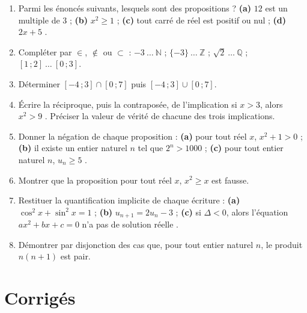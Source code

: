 \begin{enumerate}
  \item Parmi les énoncés suivants, lesquels sont des propositions ?
        \textbf{(a)} \og $12$ est un multiple de $3$ \fg{} ;
        \textbf{(b)} \og $x^2 \geq 1$ \fg{} ;
        \textbf{(c)} \og tout carré de réel est positif ou nul \fg{} ;
        \textbf{(d)} \og $2x+5$ \fg{}.
  \item Compléter par $\in$, $\notin$ ou $\subset$ : $-3 \ \ldots \ \mathbb{N}$ ; \quad
        $\{-3\} \ \ldots \ \mathbb{Z}$ ; \quad $\sqrt{2} \ \ldots \ \mathbb{Q}$ ; \quad
        $[1\,;2] \ \ldots \ [0\,;3]$.
  \item Déterminer $[-4\,;3] \cap [0\,;7]$ puis $[-4\,;3] \cup [0\,;7]$.
  \item Écrire la réciproque, puis la contraposée, de l'implication \og si $x>3$, alors
        $x^2>9$ \fg{}. Préciser la valeur de vérité de chacune des trois implications.
  \item Donner la négation de chaque proposition :
        \textbf{(a)} \og pour tout réel $x$, $x^2+1>0$ \fg{} ;
        \textbf{(b)} \og il existe un entier naturel $n$ tel que $2^n>1000$ \fg{} ;
        \textbf{(c)} \og pour tout entier naturel $n$, $u_n \geq 5$ \fg{}.
  \item Montrer que la proposition \og pour tout réel $x$, $x^2 \geq x$ \fg{} est fausse.
  \item Restituer la quantification implicite de chaque écriture :
        \textbf{(a)} $\cos^2 x + \sin^2 x = 1$ ; \textbf{(b)} $u_{n+1} = 2u_n-3$ ;
        \textbf{(c)} \og si $\Delta<0$, alors l'équation $ax^2+bx+c=0$ n'a pas de solution
        réelle \fg{}.
  \item Démontrer par disjonction des cas que, pour tout entier naturel $n$, le produit
        $n(n+1)$ est pair.
\end{enumerate}

\ifnxVersionProfesseur
\section*{Corrigés}

